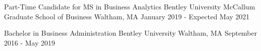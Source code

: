 

\begin{cvhonors}

  \cvhonor
    {Part-Time Candidate for MS in Business Analytics} %
    {Bentley University McCallum Graduate School of Business} %
    {Waltham, MA} %
    {January 2019 - Expected May 2021} %


  \cvhonor
    {Bachelor in Business Administration} %
    {Bentley University} %
    {Waltham, MA} %
    {September 2016 - May 2019} %
\end{cvhonors}


